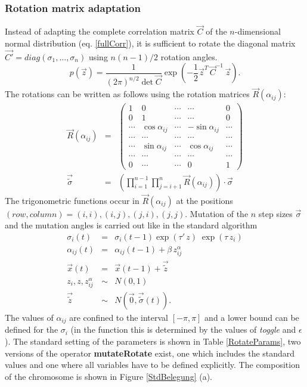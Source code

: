 \subsubsection{Rotation matrix adaptation}
\label{ss:rotate}
Instead of adapting the complete correlation matrix $\vec{C}$ of the
$n$-dimensional normal distribution (eq. \ref{fullCorr}), 
it is sufficient to rotate the diagonal matrix 
$\vec{C'}=diag(\sigma_1,\ldots,\sigma_n)$ using $n(n-1)/2$ rotation angles.
\begin{equation}
\label{fullCorr}
p(\vec{z}) = \frac{1}{(2\pi)^{n/2} \det \vec{C}}
\exp\left(-\frac{1}{2}\vec{z}^T\,\vec{C}^{-1}\,\vec{z}\right).
\end{equation}
The rotations can be written as follows using the rotation matrices
$\vec{R}(\alpha_{ij})$:
\begin{eqnarray}
\vec{R}(\alpha_{ij}) & = & \left( \begin{array}{ccccc}
1 & 0 & \cdots & \cdots &  0 \\
0 & 1 & \cdots & \cdots &  0 \\
\cdots & \cos \alpha_{ij} & \cdots & - \sin \alpha_{ij} & \cdots\\
\cdots & \cdots & \cdots & \cdots &  \cdots \\
\cdots & \sin \alpha_{ij} & \cdots & \cos \alpha_{ij} & \cdots\\
\cdots & \cdots & \cdots & \cdots &  \cdots \\
0 & \cdots & \cdots & 0 & 1
\end{array}\right)\\
\vec{{\tilde \sigma}} & = & \left( \prod^{n-1}_{i=1}\prod_{j=i+1}^{n}
\vec{R}(\alpha_{ij}) \right) \cdot \vec{\sigma}
\end{eqnarray}
The trigonometric functions occur in $\vec{R}(\alpha_{ij})$ at the
positions $(row, column) =(i,i), (i,j), (j,i), (j,j).$
Mutation of the $n$ step sizes $\vec{\sigma}$ and the mutation angles
is carried out like in the standard algorithm
\begin{eqnarray}
\sigma_i(t) & = & \sigma_i(t-1) \exp( \tau' \, z) \; \exp( \tau \,z_i)\\
\alpha_{ij}(t) & = & \alpha_{ij}(t-1) + \beta \,z^{\alpha}_{ij}\\
\vec{x}(t) & = & \vec{x}(t-1) + \vec{\tilde z}\\
z_i, z, z^{\alpha}_{ij} & \sim & N(0,1)\\
\vec{\tilde z}& \sim & N(\vec{0}, \vec{{\tilde \sigma}}(t)).
\end{eqnarray}
The values of $\alpha_{ij}$ are confined to the interval $[-\pi,\pi]$
and a lower bound can be defined for the $\sigma_i$ (in the function
this is determined by the values of {\em toggle} and $\epsilon$).
The standard setting of the parameters is shown in Table 
\ref{RotateParams}, two
versions of the operator {\sffamily\bfseries\small mutateRotate}
exist, one which includes the standard values and one where all
variables have to be defined explicitly. The composition of
the chromosome is shown in Figure \ref{StdBelegung} (a).

